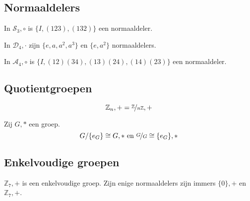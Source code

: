 \documentclass[main.tex]{subfiles}
\begin{document}
\subsection{Normaaldelers}
\begin{vb}
  In $\mathcal{S}_{3},\circ$ is $\{I,(123),(132)\}$ een normaaldeler.
\end{vb}

\begin{vb}
  In $\mathcal{D}_{4},\cdot$ zijn $\{e,a,a^{2},a^{3}\}$ en $\{e,a^{2}\}$ normaaldelers.
\end{vb}

\begin{vb}
  In $\mathcal{A}_{4},\circ$ is $\{I,(12)(34),(13)(24),(14)(23)\}$ een normaaldeler.
\end{vb}

\subsection{Quotientgroepen}

\begin{vb}
  \[ \mathbb{Z}_{n},+ = \nicefrac{\mathbb{Z}}{n\mathbb{Z}},+\]
\end{vb}

\begin{vb}
  Zij $G,*$ een groep.
  \[ G/\{ e_{G} \} \cong G,* \text{ en } \nicefrac{G}{G} \cong \{ e_{G}\},*\]
\end{vb}

\begin{vb}
\end{vb}

\begin{vb}
\end{vb}

\begin{vb}
\end{vb}

\subsection{Enkelvoudige groepen}

\begin{vb}
  $\mathbb{Z}_{7},+$ is een enkelvoudige groep.
  Zijn enige normaaldelers zijn immers $\{0\},+$ en $\mathbb{Z}_{7},+$.
\end{vb}
\end{document}
